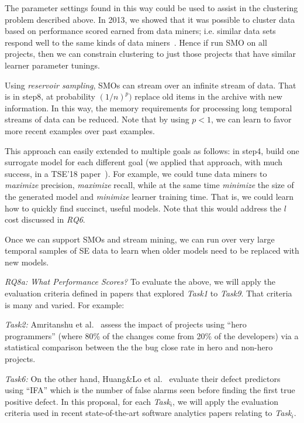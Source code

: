 \item
The parameter settings found in this way could be used to assist in the clustering problem described above. In 2013, we showed that it was possible to cluster data based on performance scored earned from data miners; i.e. similar data sets respond well to the same kinds of data miners~\cite{he13}. Hence if run SMO on all projects, then we can constrain clustering to just those projects that have similar learner parameter tunings.
\item
Using {\em reservoir sampling}\cite{Vitter:1985}, 
SMOs can   stream over an infinite stream of data. That is  in step8, at probability $(1/n)^p)$ replace old items in the archive
with new information.  In this way, the memory requirements for processing long temporal streams of data can be reduced. Note that
by using $p<1$, we can learn to favor more recent examples over past examples.
\item
This approach can easily extended to multiple goals as follows: in step4, build one surrogate model for each different goal (we applied that approach, with much success, in a TSE'18 paper~\cite{nair18}). For example, we could tune data miners to {\em maximize}   precision,
{\em maximize} recall,  while at the same time {\em minimize} the size of the generated model
and {\em minimize} learner training time. That is, we could learn how to quickly find succinct, useful models.
Note that this would address the $l$ cost discussed in {\em RQ6}.
\item
Once we can support SMOs and stream mining, we can run over very large temporal samples of SE data to learn when older models need to be replaced with new models. 
\ei



{\em RQ8a: What Performance Scores? }To evaluate the above, we will apply the evaluation criteria defined in papers that explored {\em Task1} to {\em Task9}. That
criteria is many and varied. For example:
\bi
\item
{\em Task2:} Amritanshu et al.~\cite{agrawal17hero}   assess the impact of projects using   ``hero programmers'' (where 80\% of the changes come from 20\% of the developers) via a statistical
comparison between the   
the bug close rate in hero and non-hero projects. 
\item
{\em Task6:} On the other hand, Huang\&Lo et al.~\cite{huang} evaluate their defect predictors   using ``IFA'' which is the number of false alarms seen before finding the first true positive defect.
\ei
In this proposal, for each {\em Task$_i$}, 
we will apply the  evaluation criteria used in recent state-of-the-art software analytics papers relating to {\em Task$_i$}.

